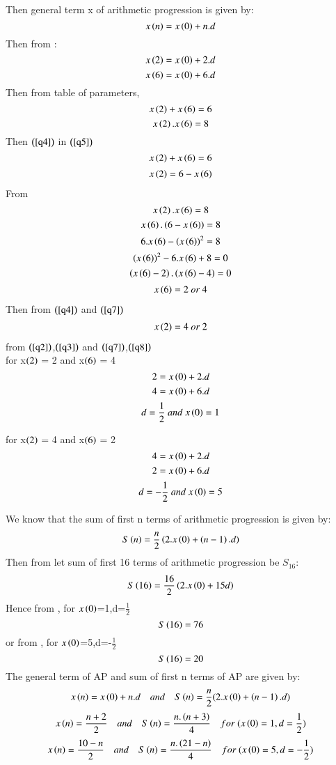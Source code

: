 \documentclass[beamer]{IEEEtran}
\theoremstyle{remark}
\begin{document}
Then general term x of arithmetic progression is given by:
\begin{equation}
\label{q1}
x\left(n\right)=x\left(0\right)+n.d
\end{equation}
Then from \brak{\ref{q1}}:
\begin{equation}
\label{q2}
x\left(2\right) = x\left(0\right)+2.d
\end{equation}
\begin{equation}
\label{q3}
x\left(6\right)=x\left(0\right)+6.d
\end{equation} 
Then from table of parameters,
\begin{equation}
\label{q4}
x\left(2\right)+x\left(6\right)=6
\end{equation}
\begin{equation}
\label{q5}
x\left(2\right).x\left(6\right)=8
\end{equation}
Then $\left(\ref{q4}\right)$ in $\left(\ref{q5}\right)$
$$x\left(2\right)+x\left(6\right)=6$$
\begin{align}
\label{q6}
    x\left(2\right)=6-x\left(6\right)
\end{align}
From \brak{\ref{q6}}
$$x\left(2\right).x\left(6\right)=8$$
$$x\left(6\right).\left(6-x\left(6\right)\right)=8$$
$$6.x\left(6\right)-\left(x\left(6\right)\right)^2=8$$
$$\left(x\left(6\right)\right)^2-6.x\left(6\right)+8=0$$
$$\left(x\left(6\right)-2\right).\left(x\left(6\right)-4\right)=0$$
\begin{align}
\label{q7}
    x\left(6\right)=2\ or\ 4
\end{align}
Then from $\left(\ref{q4}\right)$ and $\left(\ref{q7}\right)$
\begin{align}
\label{q8}
    x\left(2\right)=4\ or\ 2
\end{align}
from $\left(\ref{q2}\right)$,$\left(\ref{q3}\right)$ and $\left(\ref{q7}\right)$,$\left(\ref{q8}\right)$\\
for x$\left(2\right)$ = 2 and x$\left(6\right)$ = 4
$$2 = x\left(0\right)+2.d$$
$$4 = x\left(0\right)+6.d$$
$$d=\frac{1}{2}\ and\ x\brak{0}=1$$

for x$\left(2\right)$ = 4 and x$\left(6\right)$ = 2
$$4 = x\left(0\right)+2.d$$
$$2 = x\left(0\right)+6.d$$
$$d=-\frac{1}{2}\ and\ x\brak{0}=5$$

We know that the sum of first n terms of arithmetic progression is given by:
\begin{equation}
\label{q9}
S\left(n\right)= \frac{n}{2}\left(2.x\left(0\right)+\left(n-1\right).d\right)
\end{equation}
Then from \brak{\ref{q9}} let sum of first 16 terms of arithmetic progression be $S_{16}$:
\begin{equation}
\label{q10}
S\left(16\right)= \frac{16}{2}\left(2.x\left(0\right)+15d\right)
\end{equation}
Hence from \brak{\ref{q10}},
for $x\left(0\right)$=1,d=$\frac{1}{2}$
$$S\left(16\right)=76$$
or from \brak{\ref{q10}},
for $x\left(0\right)$=5,d=-$\frac{1}{2}$
$$S\left(16\right)=20$$
The general term of AP  and sum of first n terms of AP  are given by:
$$x\left(n\right)=x\left(0\right)+n.d\quad and\quad S\left(n\right)=\frac{n}{2}(2.x\left(0\right)+\left(n-1\right).d)$$
$$x\brak{n}=\frac{n+2}{2}\quad and\quad S\brak{n}=\frac{n.\brak{n+3}}{4}\quad for\ (x\brak{0}=1,d=\frac{1}{2})$$
$$x\brak{n}=\frac{10-n}{2}\quad and\quad S\brak{n}=\frac{n.\brak{21-n}}{4}\quad for\ (x\brak{0}=5,d=-\frac{1}{2})$$
\end{document}

